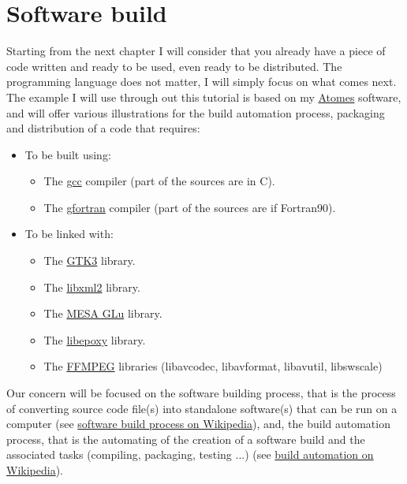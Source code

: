 \documentclass{./these-seb}
\begin{document}
\section*{Software build}

Starting from the next chapter I will consider that you already have a piece of code written and ready to be used, even ready to be distributed. 
The programming language does not matter, I will simply focus on what comes next. \\[0.25cm]
The example I will use through out this tutorial is based on my \href{https://atomes.ipcms.fr}{Atomes} software, 
and will offer various illustrations for the build automation process, packaging and distribution of a code that requires: 
\begin{itemize}
\item To be built using:
\begin{itemize}
\item The \href{https://www.gnu.org/software/gcc/}{gcc} compiler (part of the sources are in C).
\item The \href{https://gcc.gnu.org/wiki/GFortran}{gfortran} compiler (part of the sources are if Fortran90).
\end{itemize}
\item To be linked with:
\begin{itemize}
\item The \href{https://www.gtk.org/}{GTK3} library.
\item The \href{http://xmlsoft.org/}{libxml2} library.
\item The \href{https://gitlab.freedesktop.org/mesa/glu}{MESA GLu} library.
\item The \href{https://github.com/anholt/libepoxy}{libepoxy} library.
\item The \href{https://ffmpeg.org}{FFMPEG} libraries (libavcodec, libavformat, libavutil, libswscale)
\end{itemize}
\end{itemize}
\vspace{0.25cm}
\noindent Our concern will be focused on the software building process, that is the process of converting source code file(s) into standalone software(s) 
that can be run on a computer (see \href{https://en.wikipedia.org/wiki/Software\_build}{software build process on Wikipedia}), and, 
the build automation process, that is the automating of the creation of a software build and the associated tasks (compiling, packaging, testing ...) (see \href{https://en.wikipedia.org/wiki/Build\_automation}{build automation on Wikipedia}).  
\end{document}
